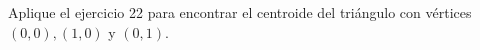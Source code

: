 \item Aplique el ejercicio 22 para encontrar el centroide del triángulo con vértices $(0, 0), (1, 0)$ y $(0, 1)$.
